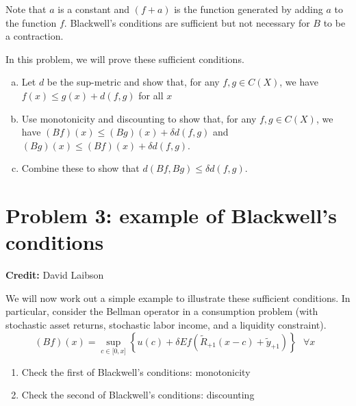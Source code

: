 \documentclass[11pt]{extarticle}
\theoremstyle{plain}
\theoremstyle{definition}
\begin{document}
\noindent
Note that $a$ is a constant and $(f+a)$ is the function generated by adding $a$ to the function $f$. Blackwell's conditions are sufficient but not necessary for $B$ to be a contraction.

\vspace{10mm}
\noindent
In this problem, we will prove these sufficient conditions.
\begin{enumerate}[(a)]
\item Let $d$ be the sup-metric and show that, for any $f, g \in C(X)$, we have $f(x) \leq g(x) + d(f, g)$ for all $x$



\item Use monotonicity and discounting to show that, for any $f, g \in C(X)$, we have $(Bf)(x) \leq (Bg)(x) + \delta d(f, g)$ and $(Bg)(x) \leq (Bf)(x) + \delta d(f, g)$. 


\item Combine these to show that $d(Bf, Bg) \leq \delta d(f, g)$. 


\end{enumerate}



\vspace{10mm}
\section*{Problem 3: example of Blackwell's conditions}

\textbf{Credit:} David Laibson

\vspace{5mm}
\noindent
We will now work out a simple example to illustrate these sufficient conditions. In particular, consider the Bellman operator in a consumption problem (with stochastic asset returns, stochastic labor income, and a liquidity constraint). 
\begin{equation*}
	(Bf)(x)=\sup_{c\in \lbrack 0,x]}\left\{ u(c)+\delta Ef(\tilde{R}_{+1}(x-c)+%
	\tilde{y}_{+1})\right\} \text{ \ }\forall x\text{\ } 
\end{equation*}

\vspace{10mm}
\noindent
\begin{enumerate}
\item Check the first of Blackwell's conditions: monotonicity


\item Check the second of Blackwell's conditions: discounting



\end{enumerate}
\end{document}
